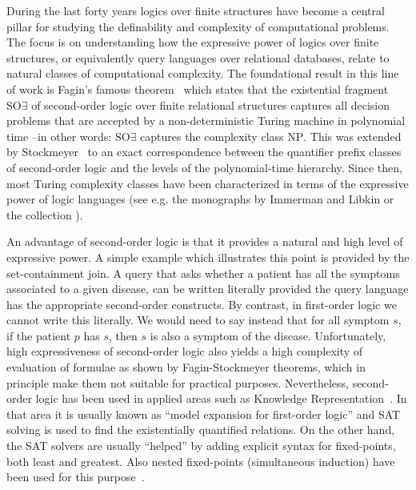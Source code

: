 \documentclass{article}
\begin{document}
During the last forty years logics over finite structures have become a central pillar for studying the definability and complexity of computational problems. The focus is on understanding how the expressive power of logics over finite structures, or equivalently query languages over relational databases, relate to natural classes of computational complexity. The foundational result in this line of work is Fagin's famous theorem~\cite{fagin:1973} which states that the existential fragment $\mathrm{SO}\exists$ of second-order logic over finite relational structures captures all decision problems that are accepted by a non-deterministic Turing machine in polynomial time --in other words: $\mathrm{SO}\exists$ captures the complexity class $\mathrm{NP}$. This was extended by Stockmeyer~\cite{Stockmeyer76} to an exact correspondence between the quantifier prefix classes of second-order logic and the levels of the polynomial-time hierarchy. Since then, most Turing complexity classes have been characterized in terms of the expressive power of logic languages (see e.g. the monographs by Immerman \cite{Immerman99} and Libkin \cite{Libkin04} or the collection \cite{graedel:eatcs2007}). 

An advantage of second-order logic is that it provides a natural and high level of expressive power. A simple example which illustrates this point is provided by the set-containment join. A query that asks whether a patient has all the symptoms associated to a given disease, can be written literally provided the query language has the appropriate second-order constructs. By contrast, in first-order logic we cannot write this literally. We would need to say instead that for all symptom $s$, if the patient $p$ has $s$, then $s$ is also a symptom of the disease. Unfortunately, high expressiveness of second-order logic also yields a high complexity of evaluation of formulae as shown by Fagin-Stockmeyer theorems, which in principle make them not suitable for practical purposes. 
Nevertheless, second-order logic has been used in applied areas such as Knowledge Representation~\cite{BruynoogheB0CPJ15}. In that area it is usually known as ``model expansion for first-order logic'' and SAT solving is used to find the existentially quantified relations. On the other hand, the SAT solvers are usually ``helped'' by adding explicit syntax for fixed-points, both least and greatest. Also nested fixed-points (simultaneous induction) have been used for this purpose~\cite{HouCD10}.
\end{document}
